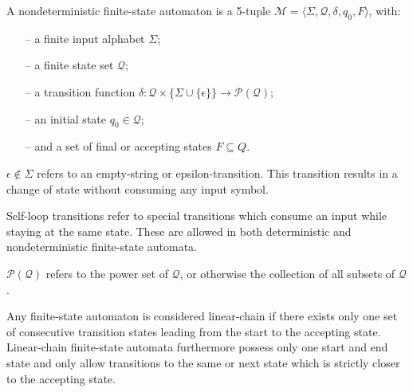\begin{definition}
  \label{def:nd-fsa}
  A nondeterministic finite-state automaton is a 5-tuple $\mathcal{M} = \langle \Sigma, \mathcal{Q}, \delta, q_0, F \rangle$, with:
  \begin{itemize}
    \itemsep0em 
    \item[--] a finite input alphabet $\Sigma$;
    \item[--] a finite state set $\mathcal{Q}$;
    \item[--] a transition function $\delta: \mathcal{Q} \times \{\Sigma \cup \{\epsilon\}\} \rightarrow \mathcal{P}(\mathcal{Q})$;
    \item[--] an initial state $q_0 \in \mathcal{Q}$; 
    \item[--] and a set of final or accepting states $F \subseteq Q$.
  \end{itemize}

  \begin{remark}
    $\epsilon \notin \Sigma$ refers to an empty-string or epsilon-transition. This transition results in a change of state without consuming any input symbol.
  \end{remark}

  \begin{remark}
    Self-loop transitions refer to special transitions which consume an input while staying at the same state. These are allowed in both deterministic and nondeterministic finite-state automata.
  \end{remark}
  
  \begin{remark}
    $\mathcal{P}(\mathcal{Q})$ refers to the power set of $\mathcal{Q}$, or otherwise the collection of all subsets of $\mathcal{Q}$.
  \end{remark}
\end{definition}

\begin{definition}
  \label{def:lfa}
  Any finite-state automaton is considered linear-chain if there exists only one set of consecutive transition states leading from the start to the accepting state. Linear-chain finite-state automata furthermore possess only one start and end state and only allow transitions to the same or next state which is strictly closer to the accepting state.
\end{definition}

